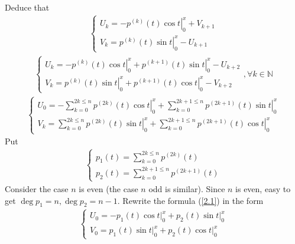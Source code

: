 \documentclass{article}
\begin{document}
Deduce that
\begin{align}
	\left\{ \begin{array}{l}
		{U_k} = \left. { - {p^{\left( k \right)}}\left( t \right)\cos t} \right|_0^x + {V_{k + 1}}\\
		{V_k} = \left. {{p^{\left( k \right)}}\left( t \right)\sin t} \right|_0^x - {U_{k + 1}}
	\end{array} \right.
\end{align}
\begin{align}
	\left\{ \begin{array}{l}
		{U_k} = \left. { - {p^{\left( k \right)}}\left( t \right)\cos t} \right|_0^x + \left. {{p^{\left( {k + 1} \right)}}\left( t \right)\sin t} \right|_0^x - {U_{k + 2}}\\
		{V_k} = \left. {{p^{\left( k \right)}}\left( t \right)\sin t} \right|_0^x + \left. {{p^{\left( {k + 1} \right)}}\left( t \right)\cos t} \right|_0^x - {V_{k + 2}}
	\end{array} \right.,\forall k \in \mathbb{N}
\end{align}
\begin{align}
	\left\{ \begin{array}{l}
		{U_0} =  - \sum\limits_{k = 0}^{2k \le n} {\left. {{p^{\left( {2k} \right)}}\left( t \right)\cos t} \right|_0^x}  + \sum\limits_{k = 0}^{2k + 1 \le n} {\left. {{p^{\left( {2k + 1} \right)}}\left( t \right)\sin t} \right|_0^x} \\
		{V_k} = \sum\limits_{k = 0}^{2k \le n} {\left. {{p^{\left( {2k} \right)}}\left( t \right)\sin t} \right|_0^x}  + \sum\limits_{k = 0}^{2k + 1 \le n} {\left. {{p^{\left( {2k + 1} \right)}}\left( t \right)\cos t} \right|_0^x} 
	\end{array} \right.
\end{align}
Put 
\begin{align}
	\left\{ \begin{array}{l}
		{p_1}\left( t \right) = \sum\limits_{k = 0}^{2k \le n} {{p^{\left( {2k} \right)}}\left( t \right)} \\
		{p_2}\left( t \right) = \sum\limits_{k = 0}^{2k + 1 \le n} {{p^{\left( {2k + 1} \right)}}\left( t \right)} 
	\end{array} \right.
\end{align}
Consider the case $n$ is even (the case $n$ odd is similar). Since $n$ is even, easy to get $\deg {p_1} = n,\deg {p_2} = n - 1$. Rewrite the formula (\ref{2.1}) in the form
\begin{align}
	\left\{ {\begin{array}{*{20}{c}}
			{{U_0} =  - {p_1}\left( t \right)\left. {\cos t} \right|_0^x + {p_2}\left( t \right)\left. {\sin t} \right|_0^x}\\
			{{V_0} = {p_1}\left( t \right)\left. {\sin t} \right|_0^x + {p_2}\left( t \right)\left. {\cos t} \right|_0^x}
	\end{array}} \right.
\end{align}
\end{document}
